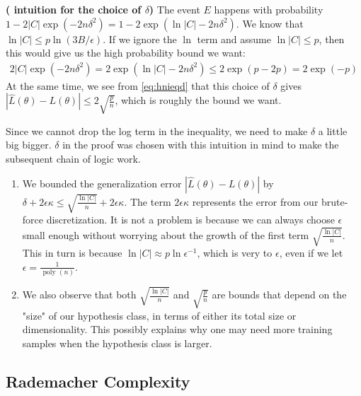 \documentclass{article}
\newcommand{\bfs}[1]{\textbf{({#1}) }}
\begin{document}
\begin{rema}\label{rema:ghyfd}\bfs{ intuition for the choice of $\delta$} The event $E$ happens with probability $1-2|C| \exp \left(-2 n \delta^{2}\right)=1-2 \exp \left(\ln |C|-2 n \delta^{2}\right) .$ We know that $\ln |C| \leq p \ln (3 B /\epsilon)$. If we ignore the $\ln$ term and assume $\ln | C| \leq p$, then this would give us the high probability bound we want:
\begin{align*}
2|C| \exp \left(-2 n \delta^{2}\right)=2 \exp \left(\ln |C|-2 n \delta^{2}\right) \leq 2 \exp (p-2 p)=2 \exp (-p)
\end{align*}
At the same time, we see from \cref{eq:hnieqd} that this choice of $\delta$ gives $|\hat{L}(\theta)-L(\theta)| \leq 2 \sqrt{\frac{p}{n}}$, which is roughly the bound we want.

Since we cannot drop the log term in the inequality, we need to make $\delta$ a little big bigger. $\delta$ in the proof was chosen with this intuition in mind to make the subsequent chain of logic work.
\end{rema} 
\begin{rema}\label{rema:gujjda}
\begin{enumerate}
    \item We bounded the generalization error $|\hat{L}(\theta)-L(\theta)|$ by $\delta+2 \epsilon \kappa \leq \sqrt{\frac{\ln |C|}{n}}+2 \epsilon \kappa .$ The term $2 \epsilon \kappa$ represents the error from our brute-force discretization. It is not a problem is because we can always choose $\epsilon$ small enough without worrying about the growth of the first term $\sqrt{\frac{\ln |C|}{n}}$. This in turn is because $\ln |C| \approx p \ln \epsilon^{-1}$, which is very  to $\epsilon$, even if we let $\epsilon=\frac{1}{\text { poly }(n)}$. 
    \item We also observe that both $\sqrt{\frac{\ln |C|}{n}}$ and $\sqrt{\frac{p}{n}}$ are bounds that depend on the "size" of our hypothesis class, in terms of either its total size or dimensionality. This possibly explains why one may need more training samples when the hypothesis class is larger.
\end{enumerate}
\end{rema} 

\subsection{Rademacher Complexity}
\end{document}
